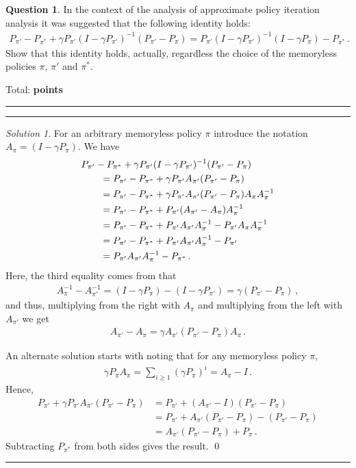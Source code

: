 \documentclass{article}
\DeclareMathOperator*{\1}{\mathbbm{1}}
\newcounter{DocPoints} %
\newcounter{QuestionPoints} %
\newcommand{\tpoints}[1]{        %
	\ifthenelse{\isempty{#1}}%
	{%
	}%
	{%
		\addtocounter{DocPoints}{#1}
		\addtocounter{QuestionPoints}{#1}
	}													 %
	\par\mbox{}\par\noindent\hfill {Total: \bf \arabic{QuestionPoints}\xspace points}\par\mbox{}\par\hrule\hrule
	\setcounter{QuestionPoints}{0}
}
\theoremstyle{definition}
\newtheorem{question}{Question}
\theoremstyle{remark}
\newtheorem*{solution*}{Solution}
\begin{document}
\begin{question}
In the context of the analysis of approximate policy iteration analysis it was suggested that the following identity holds:
\begin{align*}
P_{\pi'} - P_{\pi^*} + \gamma P_{\pi'}(I-\gamma P_{\pi'})^{-1} (P_{\pi'}-P_{\pi} )
=
P_{\pi'} (I-\gamma P_{\pi'})^{-1} (I-\gamma P_{\pi}) - P_{\pi^*}\,.
\end{align*}
Show that this identity holds, actually, regardless the choice of the memoryless policies 
$\pi$, $\pi'$ and $\pi^*$.
\tpoints{10}
\end{question}
\begin{solution*}
For an arbitrary memoryless policy $\pi$ introduce the notation $A_{\pi} = (I-\gamma P_{\pi})$.
We have
\begin{align*}
\MoveEqLeft
P_{\pi'} - P_{\pi^*} + \gamma P_{\pi'}(I-\gamma P_{\pi'})^{-1} (P_{\pi'}-P_{\pi} ) \\
& =
P_{\pi'} - P_{\pi^*} + \gamma P_{\pi'} A_{\pi'} (P_{\pi'}-P_{\pi} ) \\
& =
P_{\pi'} - P_{\pi^*} + \gamma P_{\pi'} A_{\pi'} (P_{\pi'}-P_{\pi} ) A_{\pi} A_{\pi}^{-1} \\
& =
P_{\pi'} - P_{\pi^*} + P_{\pi'} (A_{\pi'}-A_\pi) A_{\pi}^{-1} \\
& =
P_{\pi'} - P_{\pi^*} + P_{\pi'} A_{\pi'}A_{\pi}^{-1}  - P_{\pi'} A_\pi A_{\pi}^{-1} \\
& =
P_{\pi'} - P_{\pi^*} + P_{\pi'} A_{\pi'}A_{\pi}^{-1}  - P_{\pi'}  \\
& =
P_{\pi'} A_{\pi'}A_{\pi}^{-1}  - P_{\pi^*} \,.
\end{align*}
Here, the third equality comes from that
\begin{align*}
A_\pi^{-1} - A_{\pi'}^{-1} = (I-\gamma P_\pi) - (I-\gamma P_{\pi'}) = \gamma (P_{\pi'}-P_{\pi})\,,
\end{align*}
and thus, multiplying from the right with $A_\pi$ and multiplying from the left with $A_{\pi'}$ we get
\begin{align*}
A_{\pi'}-A_\pi = \gamma A_{\pi'} (P_{\pi'}-P_{\pi} ) A_{\pi} \,.
\end{align*}

An alternate solution starts with noting that
for any memoryless policy $\pi$,
\begin{align*}
\gamma P_{\pi} A_{\pi} = \sum_{i\ge 1} (\gamma P_{\pi})^i = A_\pi - I\,.
\end{align*}
Hence,
\begin{align*}
P_{\pi'} + \gamma P_{\pi'} A_{\pi'} (P_{\pi'} - P_\pi) 
&= 
P_{\pi'} + (A_{\pi'}-I) (P_{\pi'} - P_\pi) \\
&= 
P_{\pi'} + A_{\pi'}(P_{\pi'} - P_\pi) - (P_{\pi'} - P_\pi) \\
&= 
A_{\pi'}(P_{\pi'} - P_\pi) + P_\pi\,.
\end{align*}
Subtracting $P_{\pi^*}$ from both sides gives the result.
\qed\par\smallskip\hrule
\end{solution*}
\end{document}
